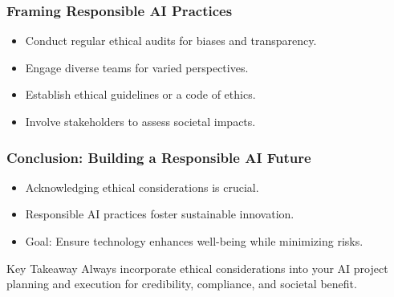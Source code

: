 \documentclass{beamer}
\begin{document}
\begin{frame}[fragile]
    \frametitle{Framing Responsible AI Practices}
    \begin{itemize}
        \item Conduct regular ethical audits for biases and transparency.
        \item Engage diverse teams for varied perspectives.
        \item Establish ethical guidelines or a code of ethics.
        \item Involve stakeholders to assess societal impacts.
    \end{itemize}
\end{frame}

\begin{frame}[fragile]
    \frametitle{Conclusion: Building a Responsible AI Future}
    \begin{itemize}
        \item Acknowledging ethical considerations is crucial.
        \item Responsible AI practices foster sustainable innovation.
        \item Goal: Ensure technology enhances well-being while minimizing risks.
    \end{itemize}
    \begin{block}{Key Takeaway}
        Always incorporate ethical considerations into your AI project planning and execution for credibility, compliance, and societal benefit.
    \end{block}
\end{frame}
\end{document}
